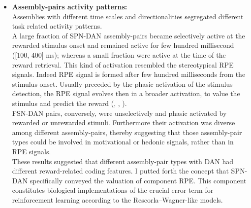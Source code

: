 \begin{itemize}
    \item \textbf{Assembly-pairs activity patterns:}\\
    Assemblies with different time scales and directionalities segregated different task related activity patterns.\\A large fraction of SPN-DAN assembly-pairs became selectively active at the rewarded stimulus onset and remained active for few hundred millisecond ([100, 400] ms); whereas a small fraction were active at the time of the reward retrieval. This kind of activation resembled the stereotypical RPE signals. Indeed RPE signal is formed after few hundred milliseconds from the stimulus onset. Usually preceded by the phasic activation of the stimulus detection, the RPE signal evolves then in a broader activation, to value the stimulus and predict the reward (\cite{Tobler2003}, \cite{Nomoto2010}, \cite{Schultz2016}).\\%
    FSN-DAN pairs, conversely, were unselectively and phasic activated by rewarded or unrewarded stimuli. Furthermore their activation was diverse among different assembly-pairs, thereby suggesting that those assembly-pair types could be involved in motivational or hedonic signals, rather than in RPE signals.\\These results suggested that different assembly-pair types with DAN had different reward-related coding features. I putted forth the concept that SPN-DAN specifically conveyed the valuation of component RPE. This component constitutes biological implementations of the crucial error term for reinforcement learning according to the Rescorla–Wagner-like models. 

\end{itemize}
